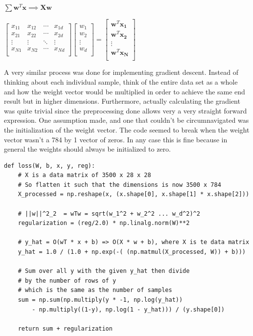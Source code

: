 \documentclass[12pt]{article}
\begin{document}
\begin{center}
  $\sum \mathbf{w}^T \mathbf{x} \implies \mathbf{X} \mathbf{w}$
\end{center}
\begin{center}
  $
    \begin{bmatrix}
      x_{11} & x_{12} & \cdots & x_{1d} \\
      x_{21} & x_{22} & \cdots & x_{2d} \\
      \vdots & \vdots & \ddots & \vdots \\
      x_{N1} & x_{N2} & \cdots & x_{Nd} \\
    \end{bmatrix}
    \begin{bmatrix}
      w_{1}  \\
      w_{2}  \\
      \vdots \\
      w_{d}  \\
    \end{bmatrix}
    =
    \begin{bmatrix}
      \mathbf{w}^T \mathbf{x_1} \\
      \mathbf{w}^T \mathbf{x_2} \\
      \vdots                    \\
      \mathbf{w}^T \mathbf{x_N} \\
    \end{bmatrix}
  $
\end{center}
A very similar process was done for implementing gradient descent. Instead of thinking about each individual sample, think of the entire
data set as a whole and how the weight vector would be multiplied in order to achieve the same end result but in higher dimensions.
Furthermore, actually calculating the gradient was quite trivial since the preprocessing done allows very a
very straight forward expression.
One assumption made, and one that couldn't be circumnavigated was the initialization of the weight vector.
The code seemed to break when the weight vector wasn't a 784 by 1 vector of zeros. In any case this is fine because in general
the weights should always be initialized to zero.
\begin{verbatim}
def loss(W, b, x, y, reg):
    # X is a data matrix of 3500 x 28 x 28
    # So flatten it such that the dimensions is now 3500 x 784
    X_processed = np.reshape(x, (x.shape[0], x.shape[1] * x.shape[2]))

    # ||w||^2_2  = wTw = sqrt(w_1^2 + w_2^2 ... w_d^2)^2
    regularization = (reg/2.0) * np.linalg.norm(W)**2

    # y_hat = O(wT * x + b) => O(X * w + b), where X is te data matrix
    y_hat = 1.0 / (1.0 + np.exp(-( (np.matmul(X_processed, W)) + b)))

    # Sum over all y with the given y_hat then divide 
    # by the number of rows of y
    # which is the same as the number of samples 
    sum = np.sum(np.multiply(y * -1, np.log(y_hat)) 
        - np.multiply((1-y), np.log(1 - y_hat))) / (y.shape[0])

    return sum + regularization
    \end{verbatim}
\end{document}

